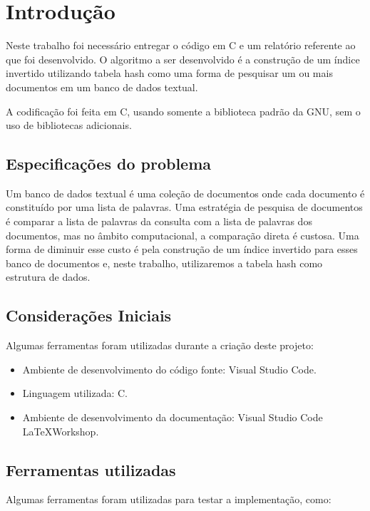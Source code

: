 \documentclass{article}
\begin{document}



\section{Introdução}

Neste trabalho foi necessário entregar o código em C e um relatório referente ao que foi desenvolvido. O algoritmo a ser desenvolvido é a construção de um índice invertido
utilizando tabela hash como uma forma de pesquisar um ou mais documentos em um banco de dados textual.

A codificação foi feita em C, usando somente a biblioteca padrão da GNU, sem o uso de bibliotecas adicionais.


\subsection{Especificações do problema}

Um banco de dados textual é uma coleção de documentos onde cada documento é constituído por uma lista de palavras. Uma estratégia de pesquisa de
documentos é comparar a lista de palavras da consulta com a lista de palavras dos documentos, mas no âmbito computacional, a comparação direta é custosa.
Uma forma de diminuir esse custo é pela construção de um índice invertido para esses banco de documentos e, neste trabalho, utilizaremos a tabela hash
como estrutura de dados.


\subsection{Considerações Iniciais}
Algumas ferramentas foram utilizadas durante a criação deste projeto:

\begin{itemize}
  \item Ambiente de desenvolvimento do código fonte: Visual Studio Code.
  \item Linguagem utilizada: C.
  \item Ambiente de desenvolvimento da documentação: Visual Studio Code \LaTeX Workshop.
\end{itemize}

\subsection{Ferramentas utilizadas}
Algumas ferramentas foram utilizadas para testar a implementação, como:
\end{document}
